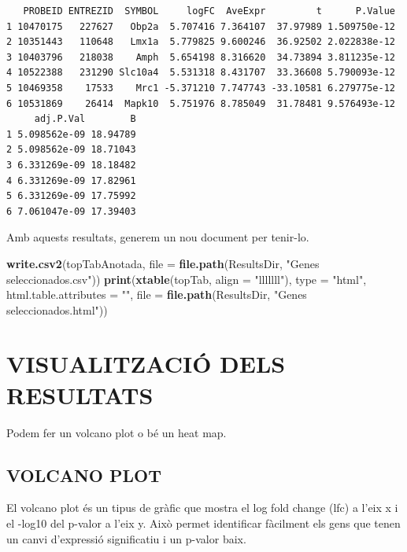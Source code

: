 \documentclass[
]{article}
\newenvironment{Shaded}{\begin{snugshade}}{\end{snugshade}}
\newcommand{\AttributeTok}[1]{\textcolor[rgb]{0.13,0.29,0.53}{#1}}
\newcommand{\FunctionTok}[1]{\textcolor[rgb]{0.13,0.29,0.53}{\textbf{#1}}}
\newcommand{\NormalTok}[1]{#1}
\newcommand{\StringTok}[1]{\textcolor[rgb]{0.31,0.60,0.02}{#1}}
\begin{document}
\begin{verbatim}
   PROBEID ENTREZID  SYMBOL     logFC  AveExpr         t      P.Value
1 10470175   227627   Obp2a  5.707416 7.364107  37.97989 1.509750e-12
2 10351443   110648   Lmx1a  5.779825 9.600246  36.92502 2.022838e-12
3 10403796   218038    Amph  5.654198 8.316620  34.73894 3.811235e-12
4 10522388   231290 Slc10a4  5.531318 8.431707  33.36608 5.790093e-12
5 10469358    17533    Mrc1 -5.371210 7.747743 -33.10581 6.279775e-12
6 10531869    26414  Mapk10  5.751976 8.785049  31.78481 9.576493e-12
     adj.P.Val        B
1 5.098562e-09 18.94789
2 5.098562e-09 18.71043
3 6.331269e-09 18.18482
4 6.331269e-09 17.82961
5 6.331269e-09 17.75992
6 7.061047e-09 17.39403
\end{verbatim}

Amb aquests resultats, generem un nou document per tenir-lo.

\begin{Shaded}
\begin{Highlighting}[]
\FunctionTok{write.csv2}\NormalTok{(topTabAnotada, }\AttributeTok{file =} \FunctionTok{file.path}\NormalTok{(ResultsDir, }\StringTok{"Genes seleccionados.csv"}\NormalTok{))}
\FunctionTok{print}\NormalTok{(}\FunctionTok{xtable}\NormalTok{(topTab, }\AttributeTok{align =} \StringTok{"lllllll"}\NormalTok{), }\AttributeTok{type =} \StringTok{"html"}\NormalTok{, }\AttributeTok{html.table.attributes =} \StringTok{""}\NormalTok{,}
    \AttributeTok{file =} \FunctionTok{file.path}\NormalTok{(ResultsDir, }\StringTok{"Genes seleccionados.html"}\NormalTok{))}
\end{Highlighting}
\end{Shaded}

\section{VISUALITZACIÓ DELS
RESULTATS}\label{visualitzaciuxf3-dels-resultats}

Podem fer un volcano plot o bé un heat map.

\subsection{VOLCANO PLOT}\label{volcano-plot}

El volcano plot és un tipus de gràfic que mostra el log fold change
(lfc) a l'eix x i el -log10 del p-valor a l'eix y. Això permet
identificar fàcilment els gens que tenen un canvi d'expressió
significatiu i un p-valor baix.
\end{document}
